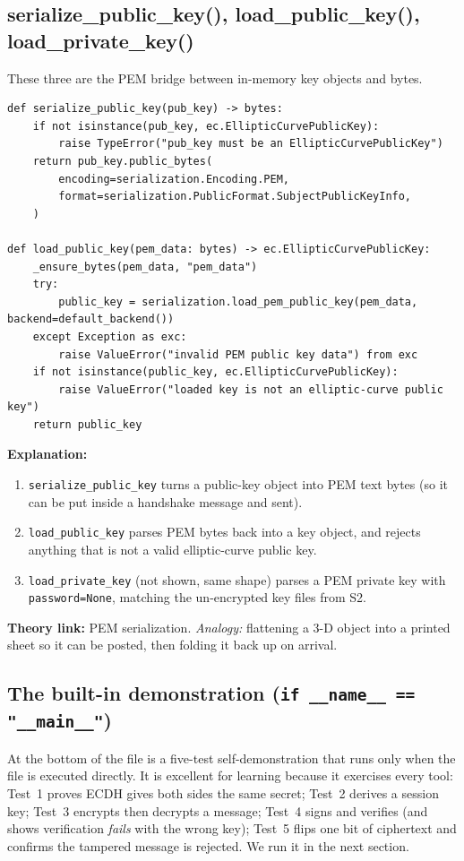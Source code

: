 \documentclass[11pt,a4paper]{article}
\begin{document}
\subsection{serialize\_public\_key(), load\_public\_key(), load\_private\_key()}
These three are the PEM bridge between in-memory key objects and bytes.
\begin{lstlisting}[style=py,caption={crypto.py --- PEM serialization helpers.}]
def serialize_public_key(pub_key) -> bytes:
    if not isinstance(pub_key, ec.EllipticCurvePublicKey):
        raise TypeError("pub_key must be an EllipticCurvePublicKey")
    return pub_key.public_bytes(
        encoding=serialization.Encoding.PEM,
        format=serialization.PublicFormat.SubjectPublicKeyInfo,
    )

def load_public_key(pem_data: bytes) -> ec.EllipticCurvePublicKey:
    _ensure_bytes(pem_data, "pem_data")
    try:
        public_key = serialization.load_pem_public_key(pem_data, backend=default_backend())
    except Exception as exc:
        raise ValueError("invalid PEM public key data") from exc
    if not isinstance(public_key, ec.EllipticCurvePublicKey):
        raise ValueError("loaded key is not an elliptic-curve public key")
    return public_key
\end{lstlisting}
\textbf{Explanation:}
\begin{enumerate}
  \item \texttt{serialize\_public\_key} turns a public-key object into PEM text
        bytes (so it can be put inside a handshake message and sent).
  \item \texttt{load\_public\_key} parses PEM bytes back into a key object, and
        rejects anything that is not a valid elliptic-curve public key.
  \item \texttt{load\_private\_key} (not shown, same shape) parses a PEM private
        key with \texttt{password=None}, matching the un-encrypted key files from
        S2.
\end{enumerate}
\textbf{Theory link:} PEM serialization. \emph{Analogy:} flattening a 3-D object
into a printed sheet so it can be posted, then folding it back up on arrival.

\subsection{The built-in demonstration (\texttt{if \_\_name\_\_ == "\_\_main\_\_"})}
At the bottom of the file is a five-test self-demonstration that runs only when
the file is executed directly. It is excellent for learning because it exercises
every tool: Test~1 proves ECDH gives both sides the same secret; Test~2 derives a
session key; Test~3 encrypts then decrypts a message; Test~4 signs and verifies
(and shows verification \emph{fails} with the wrong key); Test~5 flips one bit of
ciphertext and confirms the tampered message is rejected. We run it in the next
section.
\end{document}
